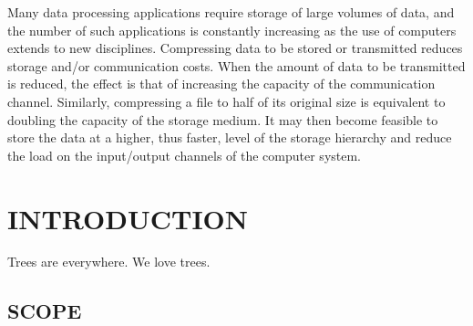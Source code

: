 \documentclass[12pt]{report}
\begin{document}
Many data processing applications require storage of large volumes of data, and the number of such applications is constantly increasing as the use of computers extends to new disciplines.  Compressing data to be stored or transmitted reduces storage and/or communication costs. When the amount of data to be transmitted is reduced, the effect is that of increasing the capacity of the communication channel. Similarly, compressing a file to half of its original size is equivalent to doubling the capacity of the storage medium. It may then become feasible to store the data at a higher, thus faster, level of the storage hierarchy and reduce the load on the input/output channels of the computer system.



\tableofcontents


\newpage

\setcounter{page}{1}

\pagestyle{fancy}
\chead{}
\rfoot{\small{\thepage}}
\renewcommand{\headrulewidth}{0.4pt}
\renewcommand{\footrulewidth}{0.4pt}

\chapter{INTRODUCTION}

Trees are everywhere. We love trees.

\section{SCOPE}
\end{document}
